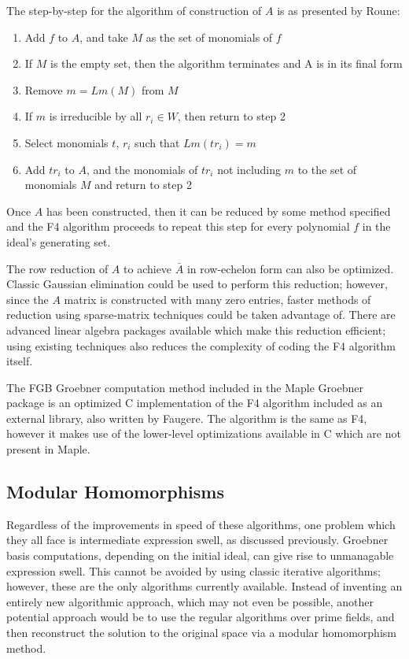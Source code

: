 \documentclass[letterpaper,12pt,titlepage,oneside,final]{book}
\begin{document}
The step-by-step for the algorithm of construction of ${A}$ is as presented by Roune:
\begin{enumerate}
  \item Add ${f}$ to ${A}$, and take ${M}$ as the set of monomials of ${f}$
  \item If ${M}$ is the empty set, then the algorithm terminates and A is in its final form
  \item Remove $m = {Lm(M)}$ from ${M}$
  \item If ${m}$ is irreducible by all ${r_i \in W}$, then return to step 2
  \item Select monomials ${t,\, r_i}$ such that ${Lm(tr_i) = m}$
  \item Add ${tr_i}$ to ${A}$, and the monomials of ${tr_i}$ not including ${m}$ to the set of monomials ${M}$ and return to step 2
\end{enumerate}

Once ${A}$ has been constructed, then it can be reduced by some method specified and the F4 algorithm proceeds to repeat this step for every polynomial ${f}$ in the ideal's generating set.

The row reduction of ${A}$ to achieve ${\bar A}$ in row-echelon form can also be optimized.  Classic Gaussian elimination could be used to perform this reduction; however, since the ${A}$ matrix is constructed with many zero entries, faster methods of reduction using sparse-matrix techniques could be taken advantage of.  There are advanced linear algebra packages available which make this reduction efficient; using existing techniques also reduces the complexity of coding the F4 algorithm itself.

The FGB Groebner computation method included in the Maple Groebner package is an optimized C implementation of the F4 algorithm included as an external library, also written by Faugere.  The algorithm is the same as F4, however it makes use of the lower-level optimizations available in C which are not present in Maple.     
 
\subsection{Modular Homomorphisms}

Regardless of the improvements in speed of these algorithms, one problem which they all face is intermediate expression swell, as discussed previously.  Groebner basis computations, depending on the initial ideal, can give rise to unmanagable expression swell.  This cannot be avoided by using classic iterative algorithms; however, these are the only algorithms currently available.  Instead of inventing an entirely new algorithmic approach, which may not even be possible, another potential approach would be to use the regular algorithms over prime fields, and then reconstruct the solution to the original space via a modular homomorphism method.
\end{document}
